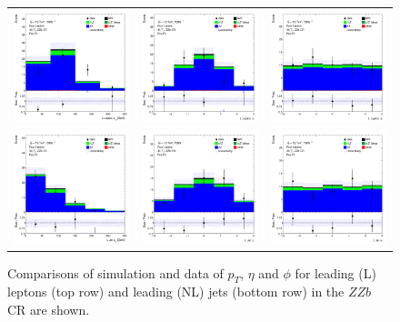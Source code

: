 \begin{figure}[htbp]
\begin{tabular}{ccc}
    \includegraphics[width=.25\textwidth]{figures/PreFitPlots/lep4_ZZb_4T_L_lepton_pt.png} &
    \includegraphics[width=.25\textwidth]{figures/PreFitPlots/lep4_ZZb_4T_L_lepton_eta.png} &
    \includegraphics[width=.25\textwidth]{figures/PreFitPlots/lep4_ZZb_4T_L_lepton_phi.png} \\
    \includegraphics[width=.25\textwidth]{figures/PreFitPlots/lep4_ZZb_4T_LJet_pt.png} &
    \includegraphics[width=.25\textwidth]{figures/PreFitPlots/lep4_ZZb_4T_LJet_eta.png} &
    \includegraphics[width=.25\textwidth]{figures/PreFitPlots/lep4_ZZb_4T_LJet_phi.png} \\

  \end{tabular}
    \caption{Comparisons of simulation and data of $p_{T}$, $\eta$ and $\phi$ for leading (L) leptons (top row) and leading (NL) jets (bottom row) in the $ZZb$ CR are shown.}
  \label{fig:4lep-ZZb-CR-leptonPlots}
\end{figure}
